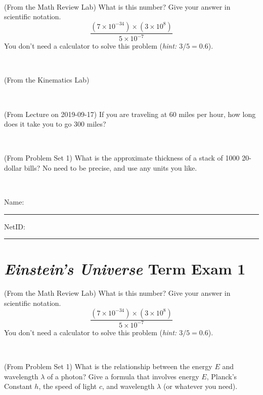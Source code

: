 \documentclass[12pt, letterpaper]{article}
\begin{document}
\vfill ~


\clearpage


\begin{problem} (From the Math Review Lab)
What is this number? Give your answer in scientific notation.
$$
\frac{(7\times10^{-34})\times(3\times10^8)}{5\times10^{-7}}
$$
You don't need a calculator to solve this problem (\textit{hint: $3/5=0.6$}).
\end{problem}


\vfill ~

\begin{problem} (From the Kinematics Lab)

\end{problem}


\vfill ~

\begin{problem} (From Lecture on 2019-09-17)
If you are traveling at 60 miles per hour, how long does
it take you to go 300 miles?
\end{problem}


\vfill ~

\begin{problem} (From Problem Set 1)
What is the approximate thickness of a stack of 1000 20-dollar bills?
No need to be precise, and use any units you like.
\end{problem}


\vfill ~


\cleardoublepage



\noindent
Name: \rule[-1ex]{0.60\textwidth}{0.1pt}
NetID: \rule[-1ex]{0.20\textwidth}{0.1pt}

\section*{\textsl{Einstein's Universe} Term Exam 1}
\setcounter{problem}{1}


\begin{problem} (From the Math Review Lab)
What is this number? Give your answer in scientific notation.
$$
\frac{(7\times10^{-34})\times(3\times10^8)}{5\times10^{-7}}
$$
You don't need a calculator to solve this problem (\textit{hint: $3/5=0.6$}).
\end{problem}


\vfill ~

\begin{problem} (From Problem Set 1)
What is the relationship between the energy $E$ and wavelength
$\lambda$ of a photon? Give a formula that involves energy $E$,
Planck's Constant $h$, the speed of light $c$, and wavelength
$\lambda$ (or whatever you need).
\end{problem}
\end{document}
